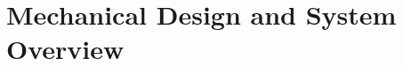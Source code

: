 \documentclass[letterpaper, 10 pt, conference]{ieeeconf}  %
\newcommand{\filip}[1]{{\color{green}#1}}
\begin{document}



\section{Mechanical Design and System Overview}
\end{document}
